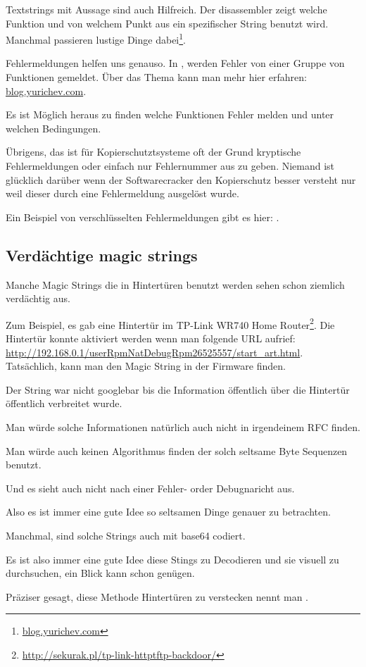 Textstrings mit Aussage sind auch Hilfreich.
Der \IDA disassembler zeigt welche Funktion und von welchem Punkt aus ein spezifischer String benutzt wird.
Manchmal passieren lustige Dinge dabei\footnote{\href{http://go.yurichev.com/17223}{blog.yurichev.com}}.

Fehlermeldungen helfen uns genauso.
In \oracle, werden Fehler von einer Gruppe von Funktionen gemeldet.
\"Uber das Thema kann man mehr hier erfahren: \href{http://go.yurichev.com/17224}{blog.yurichev.com}.


Es ist M\"oglich heraus zu finden welche Funktionen Fehler melden und unter welchen Bedingungen.


\"Ubrigens, das ist f\"ur Kopierschutztsysteme oft der Grund kryptische Fehlermeldungen oder einfach nur 
Fehlernummer aus zu geben. Niemand ist gl\"ucklich dar\"uber wenn der Softwarecracker den Kopierschutz besser
versteht nur weil dieser durch eine Fehlermeldung ausgel\"ost wurde.

Ein Beispiel von verschl\"usselten Fehlermeldungen gibt es hier: .

\subsection{Verd\"achtige magic strings}

Manche Magic Strings die in Hintert\"uren benutzt werden sehen schon ziemlich verd\"achtig aus.

Zum Beispiel, es gab eine Hintert\"ur im TP-Link WR740 Home Router\footnote{\url{http://sekurak.pl/tp-link-httptftp-backdoor/}}.
Die Hintert\"ur konnte aktiviert werden wenn man folgende URL aufrief:
\url{http://192.168.0.1/userRpmNatDebugRpm26525557/start_art.html}.\\

Tats\"achlich, kann man den Magic String  in der Firmware finden.

Der String war nicht googlebar bis die Information \"offentlich \"uber die Hintert\"ur \"offentlich verbreitet wurde.


Man w\"urde solche Informationen nat\"urlich auch nicht in irgendeinem \ac{RFC} finden.


Man w\"urde auch keinen Algorithmus finden der solch seltsame Byte Sequenzen benutzt.


Und es sieht auch nicht nach einer Fehler- order Debugnaricht aus.


Also es ist immer eine gute Idee so seltsamen Dinge genauer zu betrachten.


Manchmal, sind solche Strings auch mit base64 codiert.

Es ist also immer eine gute Idee diese Stings zu Decodieren und sie visuell zu durchsuchen, ein Blick
kann schon gen\"ugen.

Pr\"aziser gesagt, diese Methode Hintert\"uren zu verstecken nennt man .
